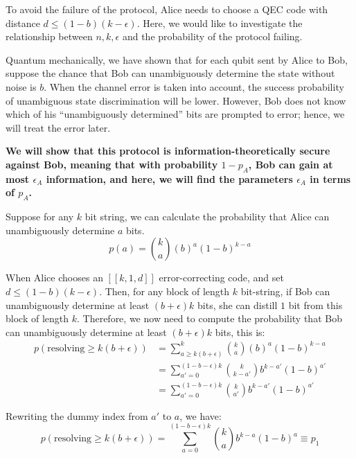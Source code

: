 \documentclass[%
 reprint,
superscriptaddress,
 amsmath,amssymb,
 aps,
]{revtex4-2}
\begin{document}
To avoid the failure of the protocol, Alice needs to choose a QEC code with distance $d\le (1-b)(k-\epsilon)$. Here, we would like to investigate the relationship between $n, k, \epsilon$ and the probability of the protocol failing.

Quantum mechanically, we have shown that for each qubit sent by Alice to Bob, suppose the chance that Bob can unambiguously determine the state without noise is $b$. When the channel error is taken into account, the success probability of unambiguous state discrimination will be lower. However, Bob does not know which of his ``unambiguously determined'' bits are prompted to error; hence, we will treat the error later.


\textbf{We will show that this protocol is information-theoretically secure against Bob, meaning that with probability $1-p_A$, Bob can gain at most $\epsilon_A$ information, and here, we will find the parameters $\epsilon_A$ in terms of $p_A$.}

Suppose for any $k$ bit string, we can calculate the probability that Alice can unambiguously determine $a$ bits.
\begin{equation}
    p(a) = \binom{k}{a} \left(b\right)^a\left(1-b\right)^{k-a}
\end{equation}

When Alice chooses an $[[k, 1, d]]$ error-correcting code, and set $d \le(1-b)(k-\epsilon)$. Then, for any block of length $k$ bit-string, if Bob can unambiguously determine at least $(b+\epsilon)k$ bits, she can distill $1$ bit from this block of length $k$. Therefore, we now need to compute the probability that Bob can unambiguously determine at least $\left(b+\epsilon\right)k$ bits, this is:
\begin{equation}
\begin{split}
    p(\text{resolving}\ge k(b+\epsilon)) &= \sum_{a\ge k(b+\epsilon)}^k \binom{k}{a}\left(b\right)^a\left(1-b\right)^{k-a}\\
    &=\sum_{a'=0}^{(1-b-\epsilon)k}\binom{k}{k-a'}b^{k-a'}(1-b)^{a'}\\
    &=\sum_{a'=0}^{(1-b-\epsilon)k}\binom{k}{a'}b^{k-a'}(1-b)^{a'}
\end{split}
\end{equation}

Rewriting the dummy index from $a'$ to $a$, we have:
\begin{equation}
    p(\text{resolving}\ge k(b+\epsilon)) = \sum_{a=0}^{(1-b-\epsilon)k}\binom{k}{a}b^{k-a}(1-b)^{a}\equiv p_1
    \label{eq:p_each_block}
\end{equation}
\end{document}
